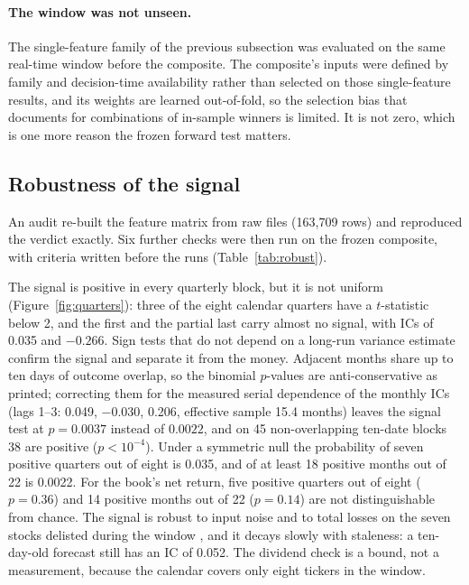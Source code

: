 \paragraph{The window was not unseen.} The single-feature family of the previous subsection was evaluated on the same real-time window before the composite. The composite's inputs were defined by family and decision-time availability rather than selected on those single-feature results, and its weights are learned out-of-fold, so the selection bias that \citet{novymarx2015} documents for combinations of in-sample winners is limited. It is not zero, which is one more reason the frozen forward test matters.

\subsection{Robustness of the signal}\label{sec:robust}

An audit re-built the feature matrix from raw files (163,709 rows) and reproduced the verdict exactly. Six further checks were then run on the frozen composite, with criteria written before the runs (Table~\ref{tab:robust}).



The signal is positive in every quarterly block, but it is not uniform (Figure~\ref{fig:quarters}): three of the eight calendar quarters have a $t$-statistic below 2, and the first and the partial last carry almost no signal, with ICs of 0.035 and $-0.266$. Sign tests that do not depend on a long-run variance estimate confirm the signal and separate it from the money. Adjacent months share up to ten days of outcome overlap, so the binomial $p$-values are anti-conservative as printed; correcting them for the measured serial dependence of the monthly ICs (lags 1--3: 0.049, $-0.030$, 0.206, effective sample 15.4 months) leaves the signal test at $p=0.0037$ instead of $0.0022$, and on 45 non-overlapping ten-date blocks 38 are positive ($p<10^{-4}$). Under a symmetric null the probability of seven positive quarters out of eight is 0.035, and of at least 18 positive months out of 22 is 0.0022. For the book's net return, five positive quarters out of eight ($p=0.36$) and 14 positive months out of 22 ($p=0.14$) are not distinguishable from chance. The signal is robust to input noise and to total losses on the seven stocks delisted during the window \citep[cf.][]{shumway1997}, and it decays slowly with staleness: a ten-day-old forecast still has an IC of 0.052. The dividend check is a bound, not a measurement, because the calendar covers only eight tickers in the window.


